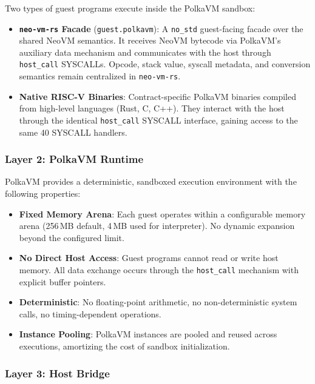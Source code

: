 \documentclass[11pt,a4paper]{article}
\begin{document}
Two types of guest programs execute inside the PolkaVM sandbox:

\begin{itemize}[noitemsep]
    \item \textbf{\texttt{neo-vm-rs} Facade} (\texttt{guest.polkavm}): A
          \texttt{no\_std} guest-facing facade over the shared NeoVM semantics.
          It receives NeoVM bytecode via PolkaVM's auxiliary data mechanism
          and communicates with the host through \texttt{host\_call}
          SYSCALLs. Opcode, stack value, syscall metadata, and conversion
          semantics remain centralized in \texttt{neo-vm-rs}.
    \item \textbf{Native RISC-V Binaries}: Contract-specific PolkaVM binaries
          compiled from high-level languages (Rust, C, C++). They interact
          with the host through the identical \texttt{host\_call} SYSCALL
          interface, gaining access to the same 40 SYSCALL handlers.
\end{itemize}

\subsubsection{Layer 2: PolkaVM Runtime}

PolkaVM provides a deterministic, sandboxed execution environment with the
following properties:

\begin{itemize}[noitemsep]
    \item \textbf{Fixed Memory Arena}: Each guest operates within a
          configurable memory arena (256\,MB default, 4\,MB used for
          interpreter). No dynamic expansion beyond the configured limit.
    \item \textbf{No Direct Host Access}: Guest programs cannot read or write
          host memory. All data exchange occurs through the \texttt{host\_call}
          mechanism with explicit buffer pointers.
    \item \textbf{Deterministic}: No floating-point arithmetic, no
          non-deterministic system calls, no timing-dependent operations.
    \item \textbf{Instance Pooling}: PolkaVM instances are pooled and reused
          across executions, amortizing the cost of sandbox initialization.
\end{itemize}

\subsubsection{Layer 3: Host Bridge}
\end{document}
